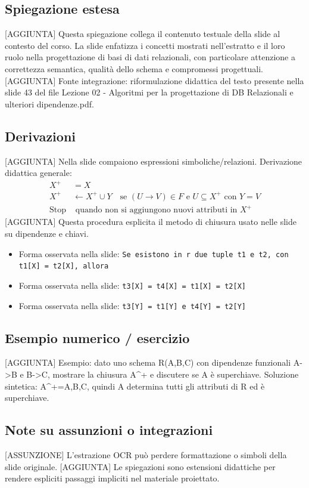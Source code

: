 \documentclass[11pt]{article}
\begin{document}
\subsection*{Spiegazione estesa}
[AGGIUNTA] Questa spiegazione collega il contenuto testuale della slide al contesto del corso. La slide enfatizza i concetti mostrati nell'estratto e il loro ruolo nella progettazione di basi di dati relazionali, con particolare attenzione a correttezza semantica, qualità dello schema e compromessi progettuali.
[AGGIUNTA] Fonte integrazione: riformulazione didattica del testo presente nella slide 43 del file Lezione 02 - Algoritmi per la progettazione di DB Relazionali e ulteriori dipendenze.pdf.
\subsection*{Derivazioni}
[AGGIUNTA] Nella slide compaiono espressioni simboliche/relazioni. Derivazione didattica generale:
\begin{align*}
X^+ &= X \\
X^+ &\leftarrow X^+ \cup Y \quad \text{se } (U \to V) \in F \text{ e } U \subseteq X^+ \text{ con } Y=V \\
\text{Stop} &\text{ quando non si aggiungono nuovi attributi in } X^+
\end{align*}
[AGGIUNTA] Questa procedura esplicita il metodo di chiusura usato nelle slide su dipendenze e chiavi.
\begin{itemize}[leftmargin=*]
\item Forma osservata nella slide: \texttt{Se esistono in r due tuple t1 e t2, con t1[X] = t2[X], allora}
\item Forma osservata nella slide: \texttt{t3[X] = t4[X] = t1[X] = t2[X]}
\item Forma osservata nella slide: \texttt{t3[Y] = t1[Y] e t4[Y] = t2[Y]}
\end{itemize}
\subsection*{Esempio numerico / esercizio}
[AGGIUNTA] Esempio: dato uno schema R(A,B,C) con dipendenze funzionali A->B e B->C, mostrare la chiusura A^+ e discutere se A è superchiave. Soluzione sintetica: A^+={A,B,C}, quindi A determina tutti gli attributi di R ed è superchiave.
\subsection*{Note su assunzioni o integrazioni}
[ASSUNZIONE] L'estrazione OCR può perdere formattazione o simboli della slide originale.
[AGGIUNTA] Le spiegazioni sono estensioni didattiche per rendere espliciti passaggi impliciti nel materiale proiettato.
\end{document}
